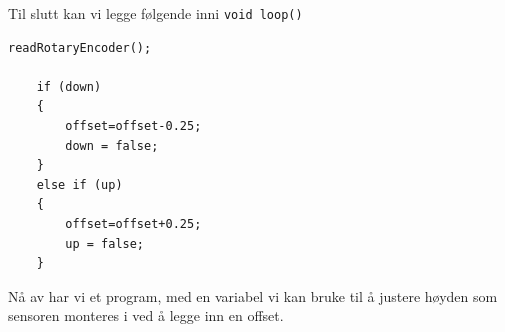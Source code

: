Til slutt kan vi legge følgende inni  \verb|void loop()|

\begin{lstlisting}[language=Arduino]
	readRotaryEncoder();

	if (down) 
	{
		offset=offset-0.25;
		down = false;
	}
	else if (up) 
	{
		offset=offset+0.25;
		up = false;
	}
\end{lstlisting}

Nå av har vi et  program, med en variabel vi kan bruke til å justere høyden som  sensoren monteres i ved å legge inn en offset. 


\vskip 5pt 



\vskip 5pt 



